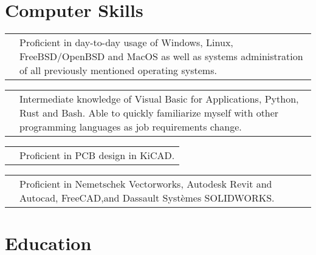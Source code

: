 \documentclass[11pt,letterpaper,sans]{moderncv}
\makeatletter
\newcommand*{\ccvitem}[3][.25em]{%
	\begin{tabular}{@{}m{\hintscolumnwidth}@{\hspace{\separatorcolumnwidth}}m{\maincolumnwidth}@{}}%
		\raggedleft\hintstyle{#2} &{#3}%
	\end{tabular}%
	\par\addvspace{#1}}
\makeatother
\begin{document}
\section{Computer Skills}
\ccvitem{Operating Systems}{Proficient in day-to-day usage of Windows, Linux, FreeBSD/OpenBSD and MacOS as well as
	systems administration of all previously mentioned \newline operating systems.}
\ccvitem{Programming/Scripting}{Intermediate knowledge of Visual Basic for Applications, Python, \newline Rust and Bash.
	Able to quickly familiarize myself with other programming languages as job requirements change.}
\ccvitem{eCAD}{Proficient in PCB design in KiCAD.}
\ccvitem{CAD}{Proficient in Nemetschek Vectorworks, Autodesk Revit and Autocad, FreeCAD,\newline and Dassault Systèmes SOLIDWORKS.}


\section{Education}
\end{document}
